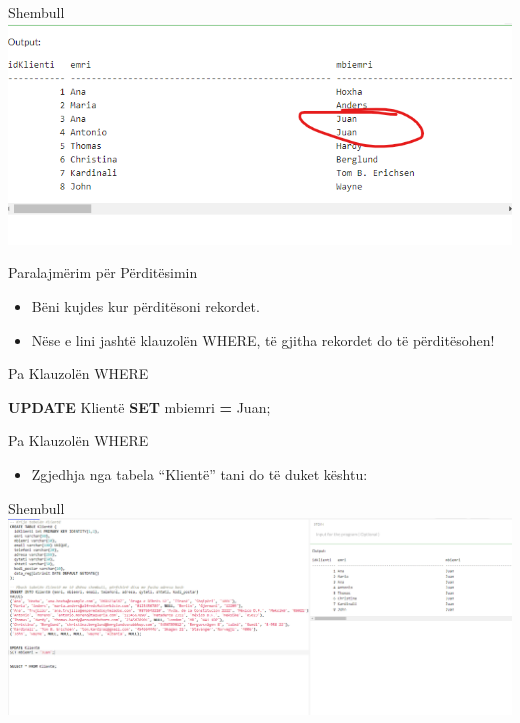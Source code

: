 \documentclass[
  ignorenonframetext,
]{beamer}
\newenvironment{Shaded}{\begin{snugshade}}{\end{snugshade}}
\newcommand{\KeywordTok}[1]{\textcolor[rgb]{0.13,0.29,0.53}{\textbf{#1}}}
\newcommand{\NormalTok}[1]{#1}
\newcommand{\OperatorTok}[1]{\textcolor[rgb]{0.81,0.36,0.00}{\textbf{#1}}}
\newcommand{\StringTok}[1]{\textcolor[rgb]{0.31,0.60,0.02}{#1}}
\providecommand{\tightlist}{%
  \setlength{\itemsep}{0pt}\setlength{\parskip}{0pt}}
\begin{document}
\begin{frame}{Shembull}
\label{shembull-11}
\includegraphics{./Figs/query36.png}
\end{frame}

\begin{frame}{Paralajmërim për Përditësimin}
\label{paralajmuxebrim-puxebr-puxebrdituxebsimin}
\begin{itemize}
\item
  Bëni kujdes kur përditësoni rekordet.
\item
  Nëse e lini jashtë klauzolën WHERE, të gjitha rekordet do të
  përditësohen!
\end{itemize}
\end{frame}

\begin{frame}[fragile]{Pa Klauzolën WHERE}
\label{pa-klauzoluxebn-where}

\begin{Shaded}
\begin{Highlighting}[]
\KeywordTok{UPDATE}\NormalTok{ Klientë}
\KeywordTok{SET}\NormalTok{ mbiemri }\OperatorTok{=} \StringTok{\textquotesingle{}Juan\textquotesingle{}}\NormalTok{;}
\end{Highlighting}
\end{Shaded}
\end{frame}

\begin{frame}{Pa Klauzolën WHERE}
\label{pa-klauzoluxebn-where-1}
\begin{itemize}
\tightlist
\item
  Zgjedhja nga tabela ``Klientë'' tani do të duket kështu:
\end{itemize}
\end{frame}

\begin{frame}{Shembull}
\label{shembull-12}
\includegraphics{./Figs/query37.png}
\end{frame}
\end{document}
